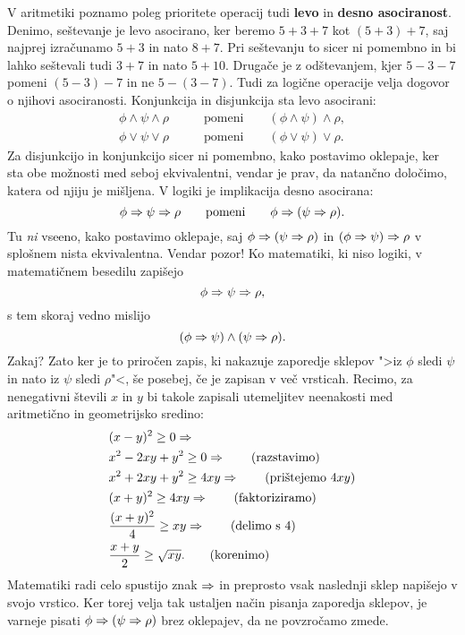 V aritmetiki poznamo poleg prioritete operacij tudi \textbf{levo} in
\textbf{desno asociranost}. Denimo, seštevanje je levo asocirano,
ker beremo $5 + 3 + 7$ kot $(5 + 3) + 7$, saj najprej izračunamo $5 +
3$ in nato $8 + 7$. Pri seštevanju to sicer ni pomembno in bi lahko
seštevali tudi $3 + 7$ in nato $5 + 10$. Drugače je z odštevanjem,
kjer $5 - 3 - 7$ pomeni $(5 - 3) - 7$ in ne $5 - (3 - 7)$. Tudi za
logične operacije velja dogovor o njihovi asociranosti. Konjunkcija in
disjunkcija sta levo asocirani:
% 
\begin{align*}
  \phi \land \psi \land \rho
  &\qquad\text{pomeni}\qquad
  (\phi \land \psi) \land \rho,\\
  \phi \lor \psi \lor \rho
  &\qquad\text{pomeni}\qquad
  (\phi \lor \psi) \lor \rho.
\end{align*}
%
Za disjunkcijo in konjunkcijo sicer ni pomembno, kako postavimo
oklepaje, ker sta obe možnosti med seboj ekvivalentni, vendar je prav,
da natančno določimo, katera od njiju je mišljena. V logiki je
implikacija desno asocirana:
%
\begin{equation*}
  \phi \Rightarrow \psi \Rightarrow \rho
  \qquad\text{pomeni}\qquad
  \phi \Rightarrow (\psi \Rightarrow \rho).
\end{equation*}
%
Tu \emph{ni} vseeno, kako postavimo oklepaje, saj $\phi \Rightarrow (\psi
\Rightarrow \rho)$ in $(\phi \Rightarrow \psi) \Rightarrow \rho$ v splošnem nista
ekvivalentna. Vendar pozor! Ko matematiki, ki niso logiki, v
matematičnem besedilu zapišejo
%
\begin{equation*}
  \phi \Rightarrow \psi \Rightarrow \rho,
\end{equation*}
%
s tem skoraj vedno mislijo
%
\begin{equation*}
  (\phi \Rightarrow \psi) \land (\psi \Rightarrow \rho).
\end{equation*}
%
Zakaj? Zato ker je to priročen zapis, ki nakazuje zaporedje sklepov
">iz $\phi$ sledi $\psi$ in nato iz $\psi$ sledi $\rho$"<, še posebej,
če je zapisan v več vrsticah. Recimo, za nenegativni števili $x$ in
$y$ bi takole zapisali utemeljitev neenakosti med aritmetično in
geometrijsko sredino:
%
\begin{align*}
  & (x - y)^2 \geq 0 \Rightarrow \\
  & x^2 - 2 x y + y^2 \geq 0 \Rightarrow
  \tag{razstavimo}\\
  & x^2 + 2 x y + y^2 \geq 4 x y \Rightarrow
  \tag{prištejemo $4 x y$}\\
  & (x + y)^2 \geq 4 x y \Rightarrow
  \tag{faktoriziramo}\\
  & \frac{(x + y)^2}{4} \geq x y \Rightarrow
  \tag{delimo s $4$}\\
  & \frac{x+y}{2} \geq \sqrt{x y}.
  \tag{korenimo}
\end{align*}
%
Matematiki radi celo spustijo znak $\Rightarrow$ in preprosto vsak
naslednji sklep napišejo v svojo vrstico. Ker torej velja tak ustaljen
način pisanja zaporedja sklepov, je varneje pisati $\phi \Rightarrow (\psi
\Rightarrow \rho)$ brez oklepajev, da ne povzročamo zmede.

